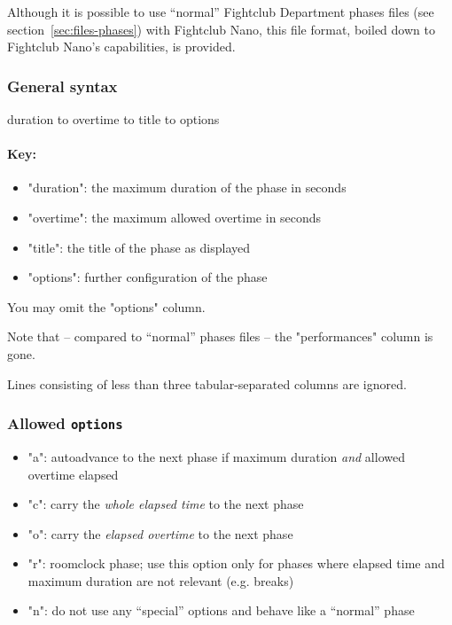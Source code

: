 \documentclass[11pt]{ltxdoc}
\newlength{\ccharwidth}
\def\tab{\hbox to \ccharwidth {{\rmfamily\small\mapsto}}}
\begin{document}
    Although it is possible to use \enquote{normal} Fightclub Department phases files (see section~\ref{sec:files-phases}) with Fightclub Nano, this file format, boiled down to Fightclub Nano's capabilities, is provided.
    
    
    \subsubsection*{General syntax}
    \begin{center}\ttfamily
        duration  \tab overtime  \tab title  \tab options
    \end{center}
    
    
    \paragraph{Key:}
    \begin{itemize}
        \item "duration": the maximum duration of the phase in seconds
        \item "overtime": the maximum allowed overtime in seconds
        \item "title": the title of the phase as displayed
        \item "options": further configuration of the phase
    \end{itemize}

    \medskip
    You may omit the "options" column.
    
    \smallskip
    Note that -- compared to \enquote{normal} phases files -- the "performances" column is gone.
    
    \smallskip
    Lines consisting of less than three tabular-separated columns are ignored.

    
    \subsubsection*{Allowed \texttt{options}}
    \begin{itemize}
        \item "a": autoadvance to the next phase if maximum duration \textit{and} allowed overtime elapsed
        \item "c": carry the \textit{whole elapsed time} to the next phase
        \item "o": carry the \textit{elapsed overtime} to the next phase
        \item "r": roomclock phase; use this option only for phases where elapsed time and maximum duration are not relevant (e.g. breaks)
        \item "n": do not use any \enquote{special} options and behave like a \enquote{normal} phase
    \end{itemize}
\end{document}
